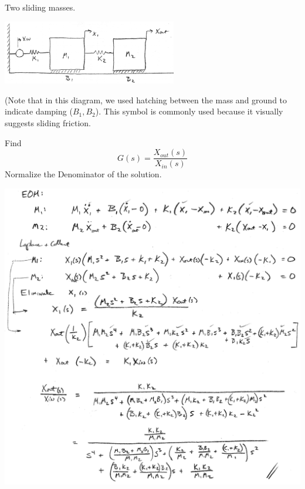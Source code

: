 \begin{Example}\label{3MassExample}
Two sliding masses.


\includegraphics[width=3.0in]{figs02/00727a.png}

(Note that in this diagram, we used hatching between the mass and ground to indicate damping ($B_1, B_2$).  This symbol is commonly used because it visually suggests sliding friction.

Find
\[
G(s) = \frac{X_{out}(s)}{X_{in}(s)}
\]
Normalize the Denominator of the solution.

\includegraphics[width=6.25in]{figs02/00729a.png}

\end{Example}




